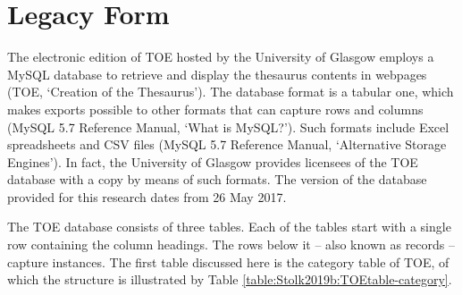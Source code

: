 \section{Legacy Form}
The electronic edition of TOE hosted by the University of Glasgow employs a MySQL database to retrieve and display the thesaurus contents in webpages (TOE, ‘Creation of the Thesaurus’). The database format is a tabular one, which makes exports possible to other formats that can capture rows and columns (MySQL 5.7 Reference Manual, ‘What is MySQL?’). Such formats include Excel spreadsheets and CSV files (MySQL 5.7 Reference Manual, ‘Alternative Storage Engines’). In fact, the University of Glasgow provides licensees of the TOE database with a copy by means of such formats. The version of the database provided for this research dates from 26 May 2017.

The TOE database consists of three tables. Each of the tables start with a single row containing the column headings. The rows below it – also known as records – capture instances. The first table discussed here is the category table of TOE, of which the structure is illustrated by Table \ref{table:Stolk2019b:TOEtable-category}.

